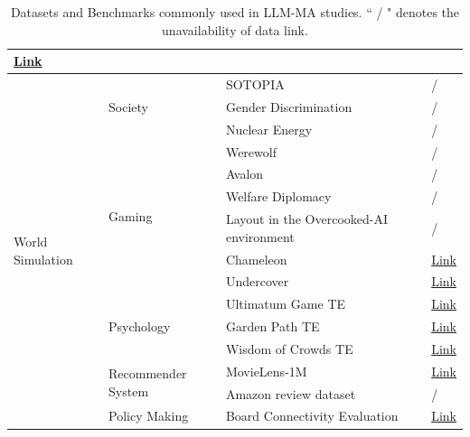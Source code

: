 \begin{table}[ht]
{\begin{tabular}{l|l|l|l|l}
  \href{https://github.com/google/BIG-bench}{Link} \\ \hline
\multirow{15}{*}{World Simulation} &
  \multirow{3}{*}{Society} &
  SOTOPIA &
  ~\cite{zhou2023sotopia} &
  / \\
 &
   &
  Gender Discrimination &
  ~\cite{gao2023s} &
  / \\
 &
   &
  Nuclear Energy &
  ~\cite{gao2023s} &
  / \\ \cline{2-5} 
 &
  \multirow{6}{*}{Gaming} &
  Werewolf &
  ~\cite{xu2023exploring} &
  / \\
 &
   &
  Avalon &
  ~\cite{light2023text} &
  / \\
 &
   &
  Welfare Diplomacy &
  ~\cite{mukobi2023welfare} &
  / \\
 &
   &
  Layout  in the Overcooked-AI environment &
  ~\cite{agashe2023evaluating} &
  / \\
 &
   &
  Chameleon &
  ~\cite{xu2023magic} &
  \href{https://github.com/cathyxl/MAgIC}{Link} \\
 &
   &
  Undercover &
  ~\cite{xu2023magic} &
  \href{https://github.com/cathyxl/MAgIC}{Link} \\ \cline{2-5} 
 &
  \multirow{3}{*}{Psychology} &
  Ultimatum Game TE &
  ~\cite{aher2023using} &
  \href{https://github.com/microsoft/turing-experiments/tree/main}{Link} \\
 &
   &
  Garden Path TE &
  ~\cite{aher2023using} &
  \href{https://github.com/microsoft/turing-experiments/tree/main}{Link} \\
 &
   &
  Wisdom of Crowds TE &
  ~\cite{aher2023using} &
  \href{https://github.com/microsoft/turing-experiments/tree/main}{Link} \\ \cline{2-5} 
 &
  \multirow{2}{*}{Recommender System} &
  MovieLens-1M &
  ~\cite{zhang2023generative} &
  \href{https://github.com/LehengTHU/Agent4Rec/tree/master/datasets/ml-1m}{Link} \\
 &
   &
  Amazon review dataset &
  ~\cite{zhang2023agentcf} &
  / \\ \cline{2-5} 
 &
  Policy Making &
  Board Connectivity Evaluation &
  ~\cite{hua2023war} &
  \href{https://github.com/agiresearch/WarAgent}{Link} \\ \hline
\end{tabular}
}
\caption{Datasets and Benchmarks commonly used in LLM-MA studies. `` / " denotes the unavailability of  data link.}
\label{db}
\end{table}


